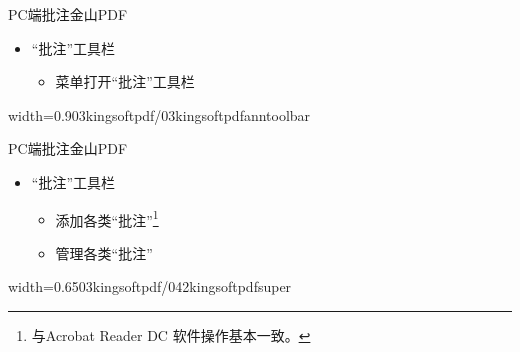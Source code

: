 \documentclass[fontset = none, t, aspectratio=169]{ctexbeamer}
\begin{document}
\begin{frame}{PC端批注}{金山PDF}
  \begin{itemize}
  \item \enquote{批注}工具栏
    \begin{itemize}
    \item {}菜单打开\enquote{批注}工具栏
    \end{itemize}
  \end{itemize}
  \vspace{5ex}
  \begin{center}
    \begin{annotationimage}{width=0.9\textwidth}{03kingsoftpdf/03kingsoftpdfanntoolbar}
    \end{annotationimage}
  \end{center}
\end{frame}

\begin{frame}{PC端批注}{金山PDF}
  \begin{itemize}
  \item \enquote{批注}工具栏
    \begin{itemize}
    \item 添加各类\enquote{批注}\footnote[frame,1]{与Acrobat Reader DC
        软件操作基本一致。}
    \item 管理各类\enquote{批注}
    \end{itemize}
  \end{itemize}
  \begin{center}
    \begin{annotationimage}{width=0.65\textwidth}{03kingsoftpdf/042kingsoftpdfsuper}
    \end{annotationimage}
  \end{center}
\end{frame}
\end{document}
